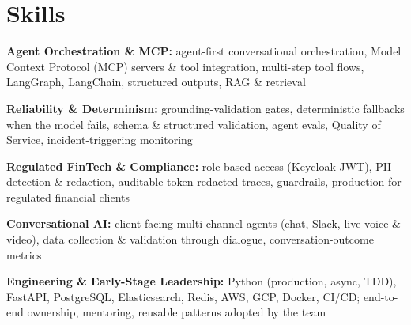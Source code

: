 \documentclass[10pt,a4paper]{article}
\begin{document}
\section{Skills}
\begin{tight}
  \item[\textcolor{accent}{\small$\bullet$}] \textbf{Agent Orchestration \& MCP:} agent-first conversational orchestration, Model Context Protocol (MCP) servers \& tool integration, multi-step tool flows, LangGraph, LangChain, structured outputs, RAG \& retrieval
  \item[\textcolor{accent}{\small$\bullet$}] \textbf{Reliability \& Determinism:} grounding-validation gates, deterministic fallbacks when the model fails, schema \& structured validation, agent evals, Quality of Service, incident-triggering monitoring
  \item[\textcolor{accent}{\small$\bullet$}] \textbf{Regulated FinTech \& Compliance:} role-based access (Keycloak JWT), PII detection \& redaction, auditable token-redacted traces, guardrails, production for regulated financial clients
  \item[\textcolor{accent}{\small$\bullet$}] \textbf{Conversational AI:} client-facing multi-channel agents (chat, Slack, live voice \& video), data collection \& validation through dialogue, conversation-outcome metrics
  \item[\textcolor{accent}{\small$\bullet$}] \textbf{Engineering \& Early-Stage Leadership:} Python (production, async, TDD), FastAPI, PostgreSQL, Elasticsearch, Redis, AWS, GCP, Docker, CI/CD; end-to-end ownership, mentoring, reusable patterns adopted by the team
\end{tight}

\end{document}
